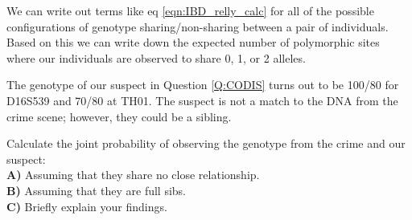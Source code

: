 {{We can write out terms like eq \eqref{eqn:IBD_relly_calc} for all of
the possible configurations of genotype
sharing/non-sharing between a pair of individuals. Based on this we can write down the expected number of
polymorphic sites where our individuals are observed to share 0, 1, or 2
alleles.

\begin{question} 
The genotype of our suspect in Question \ref{Q:CODIS} turns out to be 100/80 for
D16S539 and 70/80 at TH01. The suspect is not a match to the DNA
from the crime scene; however, they could be a sibling.

Calculate the joint probability of observing the genotype from the crime and our
suspect:\\
{\bf A)} Assuming that they share no close relationship.\\

{\bf B)} Assuming that they are full sibs.\\

{\bf C)} Briefly explain your findings.
  \end{question}

}}
